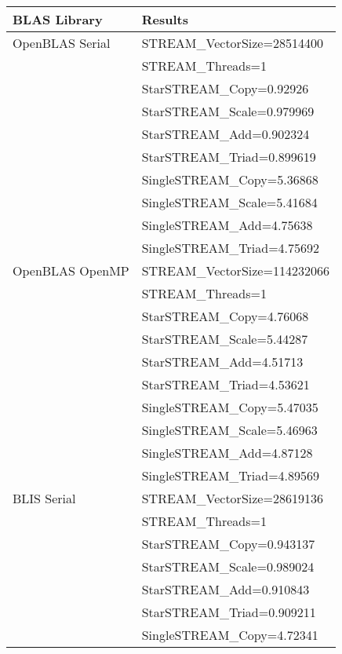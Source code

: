 \begin{table}[]
\begin{center}
\begin{tabular}{ |l|l| } 
\hline
\textbf{BLAS Library} & \textbf{Results} \\ 
\hline
OpenBLAS Serial & STREAM\_VectorSize=28514400 \\
                & STREAM\_Threads=1 \\
                & StarSTREAM\_Copy=0.92926 \\
                & StarSTREAM\_Scale=0.979969 \\
                & StarSTREAM\_Add=0.902324 \\
                & StarSTREAM\_Triad=0.899619 \\
                & SingleSTREAM\_Copy=5.36868 \\
                & SingleSTREAM\_Scale=5.41684 \\
                & SingleSTREAM\_Add=4.75638 \\
                & SingleSTREAM\_Triad=4.75692 \\
\hline
OpenBLAS OpenMP & STREAM\_VectorSize=114232066 \\
                & STREAM\_Threads=1 \\
                & StarSTREAM\_Copy=4.76068 \\
                & StarSTREAM\_Scale=5.44287 \\
                & StarSTREAM\_Add=4.51713 \\
                & StarSTREAM\_Triad=4.53621 \\
                & SingleSTREAM\_Copy=5.47035 \\
                & SingleSTREAM\_Scale=5.46963 \\
                & SingleSTREAM\_Add=4.87128 \\
                & SingleSTREAM\_Triad=4.89569 \\
\hline
BLIS Serial     & STREAM\_VectorSize=28619136 \\
                & STREAM\_Threads=1 \\
                & StarSTREAM\_Copy=0.943137 \\
                & StarSTREAM\_Scale=0.989024 \\
                & StarSTREAM\_Add=0.910843 \\
                & StarSTREAM\_Triad=0.909211 \\
                & SingleSTREAM\_Copy=4.72341 \\

\end{tabular}
\end{center}
\end{table}
